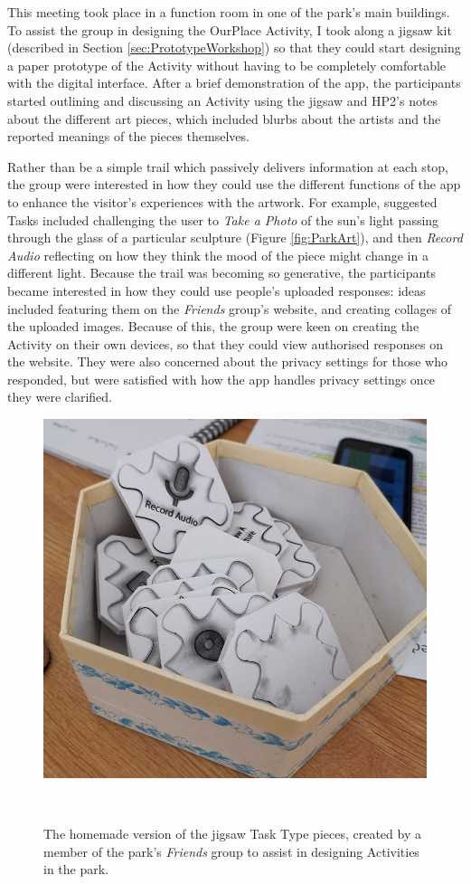 This meeting took place in a function room in one of the park's main buildings. To assist the group in designing the OurPlace Activity, I took along a jigsaw kit (described in Section \ref{sec:PrototypeWorkshop}) so that they could start designing a paper prototype of the Activity without having to be completely comfortable with the digital interface. After a brief demonstration of the app, the participants started outlining and discussing an Activity using the jigsaw and HP2's notes about the different art pieces, which included blurbs about the artists and the reported meanings of the pieces themselves. 

Rather than be a simple trail which passively delivers information at each stop, the group were interested in how they could use the different functions of the app to enhance the visitor's experiences with the artwork. For example, suggested Tasks included challenging the user to \textit{Take a Photo} of the sun's light passing through the glass of a particular sculpture (Figure \ref{fig:ParkArt}), and then \textit{Record Audio} reflecting on how they think the mood of the piece might change in a different light. Because the trail was becoming so generative, the participants became interested in how they could use people's uploaded responses: ideas included featuring them on the \textit{Friends} group's website, and creating collages of the uploaded images. Because of this, the group were keen on creating the Activity on their own devices, so that they could view authorised responses on the website. They were also concerned about the privacy settings for those who responded, but were satisfied with how the app handles privacy settings once they were clarified.

\begin{figure}
  \centering
  \includegraphics[width=0.65\columnwidth]{images/chapter06/DIY_jigsaws.jpg}
  \caption[Homemade jigsaw pieces created by a \textit{Friends} of the park group member.]{The homemade version of the jigsaw Task Type pieces, created by a member of the park's \textit{Friends} group to assist in designing Activities in the park.}~\label{fig:DIYJigsaw}
\end{figure}

